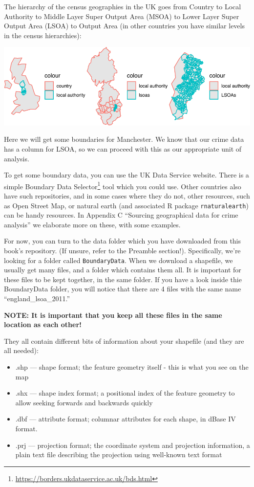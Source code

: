 \documentclass[
  krantz2]{krantz}
\providecommand{\tightlist}{%
  \setlength{\itemsep}{0pt}\setlength{\parskip}{0pt}}
\renewcommand{\href}[2]{#2\footnote{\url{#1}}}
\begin{document}
The hierarchy of the census geographies in the UK goes from Country to Local Authority to Middle Layer Super Output Area (MSOA) to Lower Layer Super Output Area (LSOA) to Output Area (in other countries you have similar levels in the census hierarchies):

\includegraphics{crime_mapping_files/figure-latex/unnamed-chunk-16-1.pdf}

Here we will get some boundaries for Manchester. We know that our crime data has a column for LSOA, so we can proceed with this as our appropriate unit of analysis.

To get some boundary data, you can use the UK Data Service website. There is a simple \href{https://borders.ukdataservice.ac.uk/bds.html}{Boundary Data Selector} tool which you could use. Other countries also have such repositories, and in some cases where they do not, other resources, such as Open Street Map, or natural earth (and associated R package \texttt{rnaturalearth}) can be handy resources. In Appendix C ``Sourcing geographical data for crime analysis'' we elaborate more on these, with some examples.

For now, you can turn to the data folder which you have downloaded from this book's repository. (If unsure, refer to the Preamble section!). Specifically, we're looking for a folder called \texttt{BoundaryData}. When we download a shapefile, we usually get many files, and a folder which contains them all. It is important for these files to be kept together, in the same folder. If you have a look inside thie BoundaryData folder, you will notice that there are 4 files with the same name ``england\_lsoa\_2011.''

\textbf{NOTE: It is important that you keep all these files in the same location as each other!}

They all contain different bits of information about your shapefile (and they are all needed):

\begin{itemize}
\tightlist
\item
  .shp --- shape format; the feature geometry itself - this is what you see on the map
\item
  .shx --- shape index format; a positional index of the feature geometry to allow seeking forwards and backwards quickly
\item
  .dbf --- attribute format; columnar attributes for each shape, in dBase IV format.
\item
  .prj --- projection format; the coordinate system and projection information, a plain text file describing the projection using well-known text format
\end{itemize}
\end{document}
